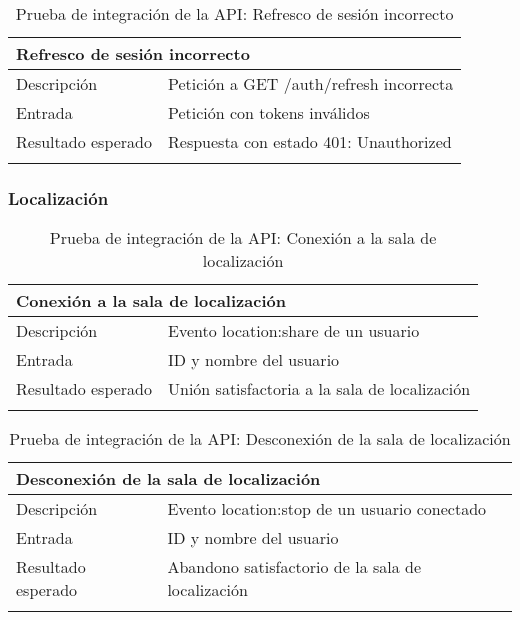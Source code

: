 \vspace{-15pt}
\begin{longtable}{|p{} p{}|}
    \hline
    \multicolumn{2}{|l|}{\textbf{Refresco de sesión incorrecto}} \\ \hline 
    Descripción                 & Petición a GET /auth/refresh incorrecta \\ \hline
    Entrada                     & Petición con tokens inválidos \\ \hline
    Resultado esperado          & Respuesta con estado 401: Unauthorized \\ \hline
    \caption{Prueba de integración de la API: Refresco de sesión incorrecto}
    \label{cp:i:api:refresco_sesion_incorrecto}
\end{longtable}

\vspace{-15pt}
\subsubsection{Localización}

\begin{longtable}{|p{} p{}|}
    \hline
    \multicolumn{2}{|l|}{\textbf{Conexión a la sala de localización}} \\ \hline 
    Descripción                 & Evento location:share de un usuario \\ \hline
    Entrada                     & ID y nombre del usuario \\ \hline
    Resultado esperado          & Unión satisfactoria a la sala de localización \\ \hline
    \caption{Prueba de integración de la API: Conexión a la sala de localización}
    \label{cp:i:api:conexion_sala_localizacion}
\end{longtable}

\begin{longtable}{|p{} p{}|}
    \hline
    \multicolumn{2}{|l|}{\textbf{Desconexión de la sala de localización}} \\ \hline 
    Descripción                 & Evento location:stop de un usuario conectado \\ \hline
    Entrada                     & ID y nombre del usuario \\ \hline
    Resultado esperado          & Abandono satisfactorio de la sala de localización \\ \hline
    \caption{Prueba de integración de la API: Desconexión de la sala de localización}
    \label{cp:i:api:desconexion_sala_localizacion}
\end{longtable}

